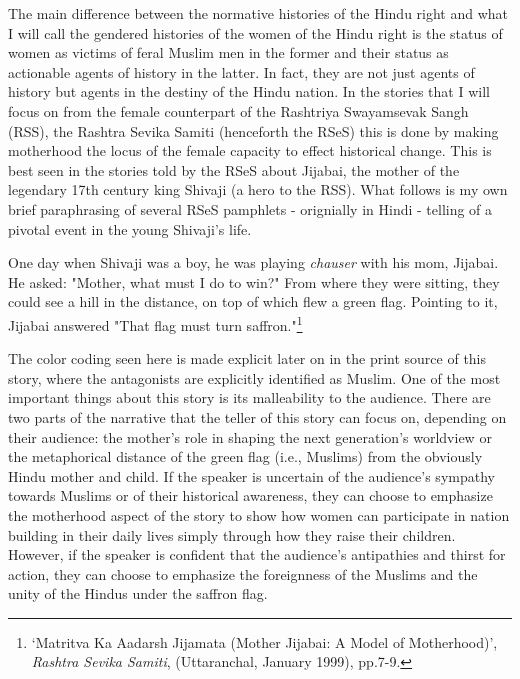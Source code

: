 \documentclass[a4paper, 12pt]{article}
\begin{document}
The main difference between the normative histories of the Hindu right and what I will call the gendered histories of the women of the Hindu right is the status of women as victims of feral Muslim men in the former and their status as actionable agents of history in the latter. In fact, they are not just agents of history but agents in the destiny of the Hindu nation. In the stories that I will focus on from the female counterpart of the Rashtriya Swayamsevak Sangh (RSS), the Rashtra Sevika Samiti (henceforth the RSeS) this is done by making motherhood the locus of the female capacity to effect historical change. This is best seen in the stories told by the RSeS about Jijabai, the mother of the legendary 17th century king Shivaji (a hero to the RSS). What follows is my own brief paraphrasing of several RSeS pamphlets - orignially in Hindi - telling of a pivotal event in the young Shivaji's life. \begin{displayquote} One day when Shivaji was a boy, he was playing \textit{chauser} with his mom, Jijabai. He asked: "Mother, what must I do to win?" From where they were sitting, they could see a hill in the distance, on top of which flew a green flag. Pointing to it, Jijabai answered "That flag must turn saffron."\footnote{‘Matritva Ka Aadarsh Jijamata (Mother Jijabai: A Model of Motherhood)’, \textit{Rashtra Sevika Samiti}, (Uttaranchal, January 1999), pp.7-9.}\end{displayquote} The color coding seen here is made explicit later on in the print source of this story, where the antagonists are explicitly identified as Muslim. One of the most important things about this story is its malleability to the audience. There are two parts of the narrative that the teller of this story can focus on, depending on their audience: the mother's role in shaping the next generation's worldview or the metaphorical distance of the green flag (i.e., Muslims) from the obviously Hindu mother and child. If the speaker is uncertain of the audience’s sympathy towards Muslims or of their historical awareness, they can choose to emphasize the motherhood aspect of the story to show how women can participate in nation building in their daily lives simply through how they raise their children. However, if the speaker is confident that the audience's antipathies and thirst for action, they can choose to emphasize the foreignness of the Muslims and the unity of the Hindus under the saffron flag. 
\par 
\end{document}
